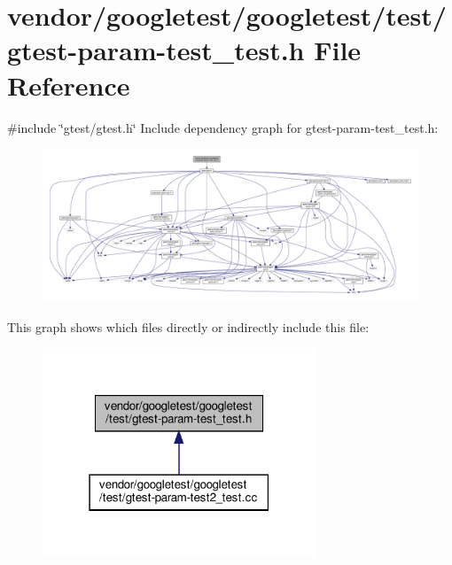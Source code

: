 \hypertarget{gtest-param-test__test_8h}{}\section{vendor/googletest/googletest/test/gtest-\/param-\/test\+\_\+test.h File Reference}
\label{gtest-param-test__test_8h}
{\ttfamily \#include \char`\"{}gtest/gtest.\+h\char`\"{}}\newline
Include dependency graph for gtest-\/param-\/test\+\_\+test.h\+:
\nopagebreak
\begin{figure}[H]
\begin{center}
\leavevmode
\includegraphics[width=350pt]{gtest-param-test__test_8h__incl}
\end{center}
\end{figure}
This graph shows which files directly or indirectly include this file\+:
\nopagebreak
\begin{figure}[H]
\begin{center}
\leavevmode
\includegraphics[width=231pt]{gtest-param-test__test_8h__dep__incl}
\end{center}
\end{figure}
